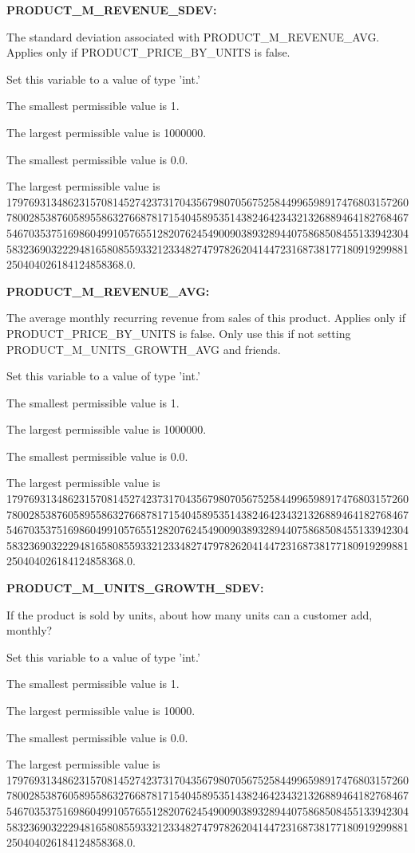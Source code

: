 \textbf{PRODUCT\_M\_REVENUE\_SDEV:}


The standard deviation associated with PRODUCT\_M\_REVENUE\_AVG.  Applies only if PRODUCT\_PRICE\_BY\_UNITS is false.

Set this variable to a value of type 'int.'

The smallest permissible value is 1.

The largest permissible value is 1000000.

The smallest permissible value is 0.0.

The largest permissible value is 179769313486231570814527423731704356798070567525844996598917476803157260780028538760589558632766878171540458953514382464234321326889464182768467546703537516986049910576551282076245490090389328944075868508455133942304583236903222948165808559332123348274797826204144723168738177180919299881250404026184124858368.0.


\textbf{PRODUCT\_M\_REVENUE\_AVG:}


The average monthly recurring revenue from sales of this product.  Applies only if PRODUCT\_PRICE\_BY\_UNITS is false.  Only use this if not setting PRODUCT\_M\_UNITS\_GROWTH\_AVG and friends.

Set this variable to a value of type 'int.'

The smallest permissible value is 1.

The largest permissible value is 1000000.

The smallest permissible value is 0.0.

The largest permissible value is 179769313486231570814527423731704356798070567525844996598917476803157260780028538760589558632766878171540458953514382464234321326889464182768467546703537516986049910576551282076245490090389328944075868508455133942304583236903222948165808559332123348274797826204144723168738177180919299881250404026184124858368.0.


\textbf{PRODUCT\_M\_UNITS\_GROWTH\_SDEV:}


If the product is sold by units, about how many units can a customer add, monthly?

Set this variable to a value of type 'int.'

The smallest permissible value is 1.

The largest permissible value is 10000.

The smallest permissible value is 0.0.

The largest permissible value is 179769313486231570814527423731704356798070567525844996598917476803157260780028538760589558632766878171540458953514382464234321326889464182768467546703537516986049910576551282076245490090389328944075868508455133942304583236903222948165808559332123348274797826204144723168738177180919299881250404026184124858368.0.


